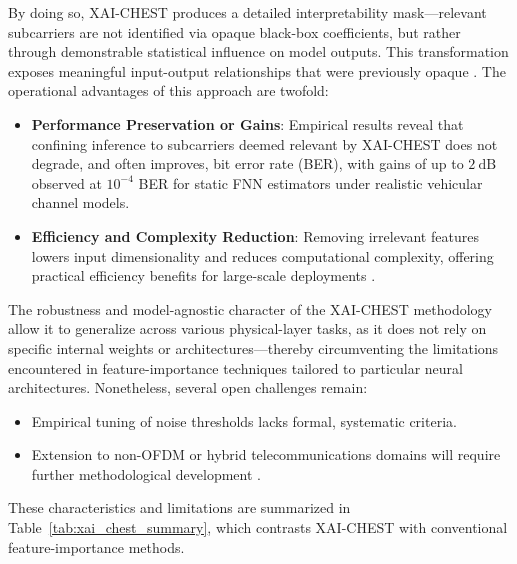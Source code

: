 \documentclass[sigconf]{acmart}
\begin{document}
By doing so, XAI-CHEST produces a detailed interpretability mask—relevant subcarriers are not identified via opaque black-box coefficients, but rather through demonstrable statistical influence on model outputs. This transformation exposes meaningful input-output relationships that were previously opaque \cite{ref41}. The operational advantages of this approach are twofold:

\begin{itemize}
    \item \textbf{Performance Preservation or Gains}: Empirical results reveal that confining inference to subcarriers deemed relevant by XAI-CHEST does not degrade, and often improves, bit error rate (BER), with gains of up to \(2~\mathrm{dB}\) observed at \(10^{-4}\) BER for static FNN estimators under realistic vehicular channel models.
    \item \textbf{Efficiency and Complexity Reduction}: Removing irrelevant features lowers input dimensionality and reduces computational complexity, offering practical efficiency benefits for large-scale deployments \cite{ref41}.
\end{itemize}

The robustness and model-agnostic character of the XAI-CHEST methodology allow it to generalize across various physical-layer tasks, as it does not rely on specific internal weights or architectures—thereby circumventing the limitations encountered in feature-importance techniques tailored to particular neural architectures. Nonetheless, several open challenges remain:

\begin{itemize}
    \item Empirical tuning of noise thresholds lacks formal, systematic criteria.
    \item Extension to non-OFDM or hybrid telecommunications domains will require further methodological development \cite{ref38}.
\end{itemize}

These characteristics and limitations are summarized in Table~\ref{tab:xai_chest_summary}, which contrasts XAI-CHEST with conventional feature-importance methods.
\end{document}
